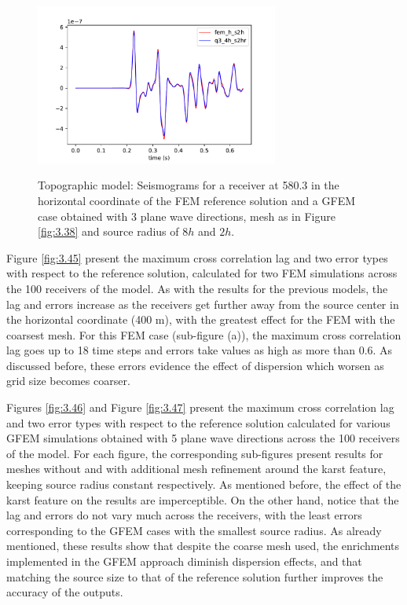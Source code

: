  \begin{figure}[h!]
	\centering
	\includegraphics[width=8cm, height=6cm]{Thesis_Edith/figures/topo/topo_waves/gfem3_topo_tr75.pdf}
	\caption{Topographic model: Seismograms for a receiver at 580.3 in the horizontal coordinate of the FEM reference solution and a GFEM case obtained with 3 plane wave directions, mesh  as in Figure \ref{fig:3.38} and source radius of $8h$ and $2h$.}
	\label{fig:3.44}
\end{figure}

\clearpage
Figure \ref{fig:3.45} present the maximum cross correlation lag and two error types with respect to the reference solution, calculated for two FEM simulations across the 100 receivers of the model. As with the results for the previous models, the lag and errors increase as the receivers get further away from the source center in the horizontal coordinate (400 m), with the greatest effect for the FEM with the coarsest mesh. For this FEM case (sub-figure (a)), the maximum cross correlation lag goes up to 18 time steps and errors take values as high as more than 0.6. As discussed before, these errors evidence the effect of dispersion which worsen as grid size becomes coarser. 

Figures \ref{fig:3.46} and Figure \ref{fig:3.47} present the maximum cross correlation lag and two error types with respect to the reference solution calculated for various GFEM simulations obtained with 5 plane wave directions across the 100 receivers of the model. For each figure, the corresponding sub-figures present results for meshes without and with additional mesh refinement around the karst feature, keeping source radius constant respectively. As mentioned before, the effect of the karst feature on the results are imperceptible. On the other hand, notice that the lag and errors do not vary much across the receivers, with the least errors corresponding to the GFEM cases with the smallest source radius. As already mentioned, these results show that despite the coarse mesh used, the enrichments implemented in the GFEM approach diminish dispersion effects, and that matching the source size to that of the reference solution further improves the accuracy of the outputs.

